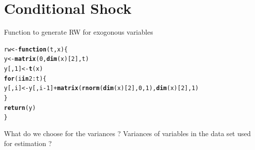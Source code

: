\documentclass[11pt,oneside, a4paper]{amsart}\usepackage[]{graphicx}\usepackage[]{color}
\makeatletter
\newcommand{\hlnum}[1]{\textcolor[rgb]{0.686,0.059,0.569}{#1}}%
\newcommand{\hlopt}[1]{\textcolor[rgb]{0,0,0}{#1}}%
\newcommand{\hlstd}[1]{\textcolor[rgb]{0.345,0.345,0.345}{#1}}%
\newcommand{\hlkwa}[1]{\textcolor[rgb]{0.161,0.373,0.58}{\textbf{#1}}}%
\newcommand{\hlkwb}[1]{\textcolor[rgb]{0.69,0.353,0.396}{#1}}%
\newcommand{\hlkwc}[1]{\textcolor[rgb]{0.333,0.667,0.333}{#1}}%
\newcommand{\hlkwd}[1]{\textcolor[rgb]{0.737,0.353,0.396}{\textbf{#1}}}%
\newenvironment{kframe}{%
 \def\at@end@of@kframe{}%
 \ifinner\ifhmode%
  \def\at@end@of@kframe{\end{minipage}}%
  \begin{minipage}{\columnwidth}%
 \fi\fi%
 \def\FrameCommand##1{\hskip\@totalleftmargin \hskip-\fboxsep
 \colorbox{shadecolor}{##1}\hskip-\fboxsep
     \hskip-\linewidth \hskip-\@totalleftmargin \hskip\columnwidth}%
 \MakeFramed {\advance\hsize-\width
   \@totalleftmargin\z@ \linewidth\hsize
   \@setminipage}}%
 {\par\unskip\endMakeFramed%
 \at@end@of@kframe}
\newenvironment{knitrout}{}{} %
\makeatother
\begin{document}
\section*{Conditional Shock}

Function to generate RW for exogonous variables
\begin{knitrout}
\color{fgcolor}\begin{kframe}
\begin{alltt}
\hlstd{rw}\hlkwb{<-}\hlkwa{function}\hlstd{(}\hlkwc{t}\hlstd{,}\hlkwc{x}\hlstd{)\{}
  \hlstd{y}\hlkwb{<-}\hlkwd{matrix}\hlstd{(}\hlnum{0}\hlstd{,}\hlkwd{dim}\hlstd{(x)[}\hlnum{2}\hlstd{],t)}
  \hlstd{y[,}\hlnum{1}\hlstd{]}\hlkwb{<-}\hlkwd{t}\hlstd{(x)}
  \hlkwa{for}\hlstd{(i} \hlkwa{in} \hlnum{2}\hlopt{:}\hlstd{t)\{}
    \hlstd{y[,i]} \hlkwb{<-} \hlstd{y[,i}\hlopt{-}\hlnum{1}\hlstd{]} \hlopt{+} \hlkwd{matrix}\hlstd{(}\hlkwd{rnorm}\hlstd{(}\hlkwd{dim}\hlstd{(x)[}\hlnum{2}\hlstd{],}\hlnum{0}\hlstd{,}\hlnum{1}\hlstd{),}\hlkwd{dim}\hlstd{(x)[}\hlnum{2}\hlstd{],}\hlnum{1}\hlstd{)}
  \hlstd{\}}
  \hlkwd{return}\hlstd{(y)}
\hlstd{\}}
\end{alltt}
\end{kframe}
\end{knitrout}


What do we choose for the variances  ? 
Variances of variables in the data set used for estimation ?\\
\end{document}
